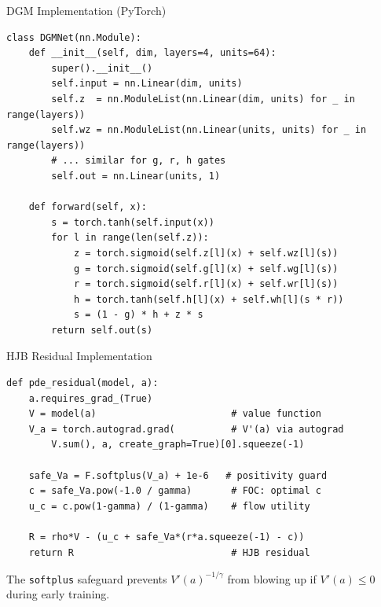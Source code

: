 \documentclass[aspectratio=169,11pt]{beamer}
\begin{document}
\begin{frame}[fragile]{DGM Implementation (PyTorch)}
\begin{lstlisting}[basicstyle=\scriptsize\ttfamily]
class DGMNet(nn.Module):
    def __init__(self, dim, layers=4, units=64):
        super().__init__()
        self.input = nn.Linear(dim, units)
        self.z  = nn.ModuleList(nn.Linear(dim, units) for _ in range(layers))
        self.wz = nn.ModuleList(nn.Linear(units, units) for _ in range(layers))
        # ... similar for g, r, h gates
        self.out = nn.Linear(units, 1)

    def forward(self, x):
        s = torch.tanh(self.input(x))
        for l in range(len(self.z)):
            z = torch.sigmoid(self.z[l](x) + self.wz[l](s))
            g = torch.sigmoid(self.g[l](x) + self.wg[l](s))
            r = torch.sigmoid(self.r[l](x) + self.wr[l](s))
            h = torch.tanh(self.h[l](x) + self.wh[l](s * r))
            s = (1 - g) * h + z * s
        return self.out(s)
\end{lstlisting}
\end{frame}

\begin{frame}[fragile]{HJB Residual Implementation}
\begin{lstlisting}[basicstyle=\footnotesize\ttfamily]
def pde_residual(model, a):
    a.requires_grad_(True)
    V = model(a)                        # value function
    V_a = torch.autograd.grad(          # V'(a) via autograd
        V.sum(), a, create_graph=True)[0].squeeze(-1)

    safe_Va = F.softplus(V_a) + 1e-6   # positivity guard
    c = safe_Va.pow(-1.0 / gamma)       # FOC: optimal c
    u_c = c.pow(1-gamma) / (1-gamma)    # flow utility

    R = rho*V - (u_c + safe_Va*(r*a.squeeze(-1) - c))
    return R                            # HJB residual
\end{lstlisting}

\vspace{0.1em}
{\footnotesize The \texttt{softplus} safeguard prevents $V'(a)^{-1/\gamma}$ from blowing up if $V'(a) \leq 0$ during early training.}
\end{frame}
\end{document}
